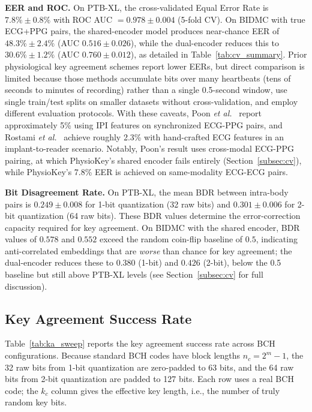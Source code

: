 \documentclass[sensors,article,submit,pdftex,moreauthors]{Definitions/mdpi}
\newcommand{\etal}{\textit{et al.}}
\begin{document}
\textbf{EER and ROC.} On PTB-XL, the cross-validated Equal Error Rate is $7.8\% \pm 0.8\%$ with ROC AUC $= 0.978 \pm 0.004$ (5-fold CV). On BIDMC with true ECG+PPG pairs, the shared-encoder model produces near-chance EER of $48.3\% \pm 2.4\%$ (AUC $0.516 \pm 0.026$), while the dual-encoder reduces this to $30.6\% \pm 1.2\%$ (AUC $0.760 \pm 0.012$), as detailed in Table~\ref{tab:cv_summary}. Prior physiological key agreement schemes report lower EERs, but direct comparison is limited because those methods accumulate bits over many heartbeats (tens of seconds to minutes of recording) rather than a single 0.5-second window, use single train/test splits on smaller datasets without cross-validation, and employ different evaluation protocols. With these caveats, Poon \etal~\cite{poon2006novel} report approximately 5\% using IPI features on synchronized ECG-PPG pairs, and Rostami \etal~\cite{rostami2013heart} achieve roughly 2.3\% with hand-crafted ECG features in an implant-to-reader scenario. Notably, Poon's result uses cross-modal ECG-PPG pairing, at which PhysioKey's shared encoder fails entirely (Section~\ref{subsec:cv}), while PhysioKey's 7.8\% EER is achieved on same-modality ECG-ECG pairs.

\textbf{Bit Disagreement Rate.} On PTB-XL, the mean BDR between intra-body pairs is $0.249 \pm 0.008$ for 1-bit quantization (32 raw bits) and $0.301 \pm 0.006$ for 2-bit quantization (64 raw bits). These BDR values determine the error-correction capacity required for key agreement. On BIDMC with the shared encoder, BDR values of $0.578$ and $0.552$ exceed the random coin-flip baseline of $0.5$, indicating anti-correlated embeddings that are \textit{worse} than chance for key agreement; the dual-encoder reduces these to $0.380$ (1-bit) and $0.426$ (2-bit), below the 0.5 baseline but still above PTB-XL levels (see Section~\ref{subsec:cv} for full discussion).

\subsection{Key Agreement Success Rate}
\label{subsec:key_agreement_rate}

Table~\ref{tab:ka_sweep} reports the key agreement success rate across BCH configurations. Because standard BCH codes have block lengths $n_c = 2^m - 1$, the 32 raw bits from 1-bit quantization are zero-padded to 63 bits, and the 64 raw bits from 2-bit quantization are padded to 127 bits. Each row uses a real BCH code; the $k_c$ column gives the effective key length, i.e., the number of truly random key bits.
\end{document}
